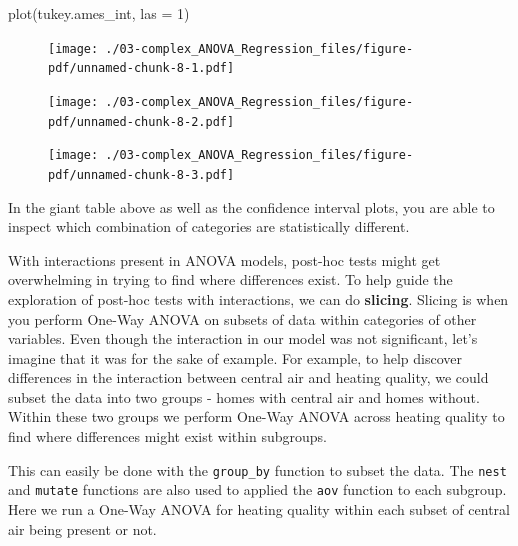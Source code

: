 \documentclass[
  letterpaper,
  DIV=11,
  numbers=noendperiod]{scrreprt}
\newenvironment{Shaded}{\begin{snugshade}}{\end{snugshade}}
\newcommand{\AttributeTok}[1]{\textcolor[rgb]{0.40,0.45,0.13}{#1}}
\newcommand{\DecValTok}[1]{\textcolor[rgb]{0.68,0.00,0.00}{#1}}
\newcommand{\FunctionTok}[1]{\textcolor[rgb]{0.28,0.35,0.67}{#1}}
\newcommand{\NormalTok}[1]{\textcolor[rgb]{0.00,0.23,0.31}{#1}}
\begin{document}
\begin{Shaded}
\begin{Highlighting}[]
\FunctionTok{plot}\NormalTok{(tukey.ames\_int, }\AttributeTok{las =} \DecValTok{1}\NormalTok{)}
\end{Highlighting}
\end{Shaded}

\begin{figure}[H]

{\centering \texttt{[image: ./03-complex\_ANOVA\_Regression\_files/figure-pdf/unnamed-chunk-8-1.pdf]}

}

\end{figure}

\begin{figure}[H]

{\centering \texttt{[image: ./03-complex\_ANOVA\_Regression\_files/figure-pdf/unnamed-chunk-8-2.pdf]}

}

\end{figure}

\begin{figure}[H]

{\centering \texttt{[image: ./03-complex\_ANOVA\_Regression\_files/figure-pdf/unnamed-chunk-8-3.pdf]}

}

\end{figure}

In the giant table above as well as the confidence interval plots, you
are able to inspect which combination of categories are statistically
different.

With interactions present in ANOVA models, post-hoc tests might get
overwhelming in trying to find where differences exist. To help guide
the exploration of post-hoc tests with interactions, we can do
\textbf{slicing}. Slicing is when you perform One-Way ANOVA on subsets
of data within categories of other variables. Even though the
interaction in our model was not significant, let's imagine that it was
for the sake of example. For example, to help discover differences in
the interaction between central air and heating quality, we could subset
the data into two groups - homes with central air and homes without.
Within these two groups we perform One-Way ANOVA across heating quality
to find where differences might exist within subgroups.

This can easily be done with the \texttt{group\_by} function to subset
the data. The \texttt{nest} and \texttt{mutate} functions are also used
to applied the \texttt{aov} function to each subgroup. Here we run a
One-Way ANOVA for heating quality within each subset of central air
being present or not.
\end{document}
